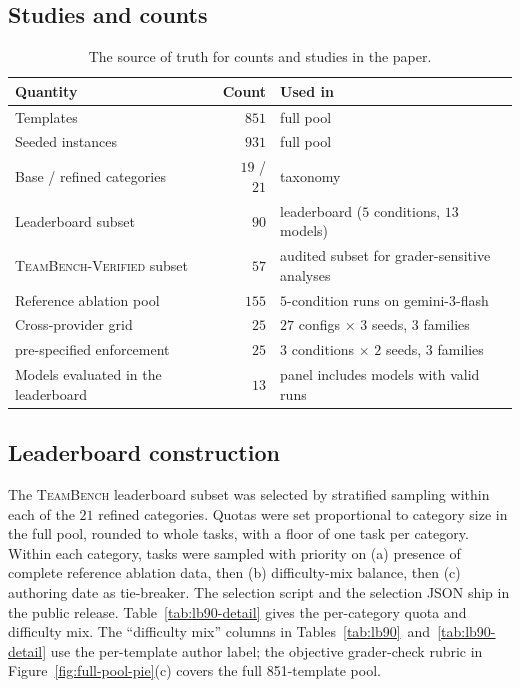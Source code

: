 \documentclass{article}
\begin{document}
\subsection{Studies and counts}
\label{app:study-counts}

\begin{table}[h]
\centering
\caption{The source of truth for counts and studies in the paper.}
\label{tab:studies}
\small
\setlength{\tabcolsep}{5pt}
\begin{tabular}{lrl}
\toprule
Quantity & Count & Used in \\
\midrule
Templates                                          & $851$ & full pool \\
Seeded instances                                   & $931$ & full pool \\
Base / refined categories                          & $19$ / $21$ & taxonomy \\
Leaderboard subset                                 & $90$  & leaderboard ($5$ conditions, $13$ models) \\
\textsc{TeamBench-Verified} subset                 & $57$  & audited subset for grader-sensitive analyses \\
Reference ablation pool                            & $155$ & $5$-condition runs on gemini-3-flash \\
Cross-provider grid                                & $25$  & $27$ configs $\times$ $3$ seeds, $3$ families \\
pre-specified enforcement                         & $25$  & $3$ conditions $\times$ $2$ seeds, $3$ families \\
Models evaluated in the leaderboard     & $13$ & panel includes models with valid runs \\
\bottomrule
\end{tabular}
\end{table}


\subsection{Leaderboard construction}
\label{app:lb90-construction}

The \textsc{TeamBench} leaderboard subset was selected by stratified sampling within each of the $21$ refined categories. Quotas were set proportional to category size in the full pool, rounded to whole tasks, with a floor of one task per category. Within each category, tasks were sampled with priority on (a) presence of complete reference ablation data, then (b) difficulty-mix balance, then (c) authoring date as tie-breaker. The selection script and the selection JSON ship in the public release. Table~\ref{tab:lb90-detail} gives the per-category quota and difficulty mix. The ``difficulty mix'' columns in Tables~\ref{tab:lb90}~and~\ref{tab:lb90-detail} use the per-template author label; the objective grader-check rubric in Figure~\ref{fig:full-pool-pie}(c) covers the full 851-template pool.
\end{document}
